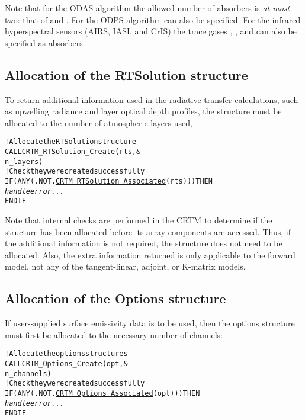 Note that for the ODAS algorithm the allowed number of absorbers is \emph{at most} two: that of \water{} and \ozone{}. For the ODPS algorithm \carbondioxide{} can also be specified. For the infrared hyperspectral sensors (AIRS, IASI, and CrIS) the trace gases \methane{}, \nitrousoxide{}, and \carbonmonoxide{} can also be specified as absorbers.


\subsection{Allocation of the RTSolution structure}
To return additional information used in the radiative transfer calculations, such as upwelling radiance and layer optical depth profiles, the \hyperref[sec:atmosphere_structure]{\RTSolution} structure must be allocated to the number of atmospheric layers used,

\begin{alltt}
  ! Allocate the RTSolution structure
  CALL \hyperref[sec:CRTM_RTSolution_Create_interface]{CRTM_RTSolution_Create}( rts     , &
                               n_layers  )
  ! Check they were created successfully
  IF ( ANY(.NOT. \hyperref[sec:CRTM_RTSolution_Associated_interface]{CRTM_RTSolution_Associated}( rts )) ) THEN
    \textrm{\textit{handle error...}}
  END IF\end{alltt}

Note that internal checks are performed in the CRTM to determine if the \hyperref[sec:atmosphere_structure]{\RTSolution} structure has been allocated before its array components are accessed. Thus, if the additional information is not required, the \hyperref[sec:atmosphere_structure]{\RTSolution} structure does not need to be allocated. Also, the extra information returned is only applicable to the forward model, not any of the tangent-linear, adjoint, or K-matrix models.


\subsection{Allocation of the Options structure}
\label{sec:alloc_structure_step:options}
If user-supplied surface emissivity data is to be used, then the options structure must first be allocated to the necessary number of channels:

\begin{alltt}
  ! Allocate the options structures
  CALL \hyperref[sec:CRTM_Options_Create_interface]{CRTM_Options_Create}( opt       , &
                            n_channels  )
  ! Check they were created successfully
  IF ( ANY(.NOT. \hyperref[sec:CRTM_Options_Associated_interface]{CRTM_Options_Associated}( opt )) ) THEN
    \textrm{\textit{handle error...}}
  END IF\end{alltt}

